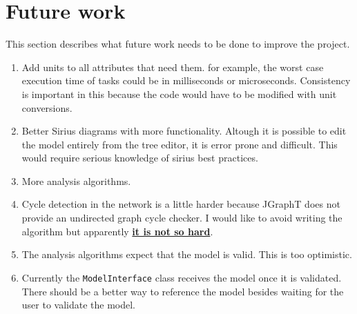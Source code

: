 \pagebreak
\section{Future work}\label{future}
This section describes what future work needs to be done to improve the project.
\begin{enumerate}
    \item Add units to all attributes that need them. for example,
    the worst case execution time of tasks could be in milliseconds
    or microseconds. Consistency is important in this because
    the code would have to be modified with unit conversions.
    \item Better Sirius diagrams with more functionality. Altough it
    is possible to edit the model entirely from the tree editor, it is
    error prone and difficult. This would require serious knowledge of
    sirius best practices.
    \item More analysis algorithms.
    \item Cycle detection in the network is a little harder because JGraphT does
    not provide an undirected graph cycle checker. I would like to avoid writing
    the algorithm but apparently 
    \href{http://stackoverflow.com/questions/526331/cycles-in-an-undirected-graph}{\textbf{it is not so hard}}. 
    \item The analysis algorithms expect that the model is valid. This is too optimistic.
    \item Currently the \texttt{ModelInterface} class receives the model once it is validated. There should be a better way to reference the model besides waiting for the user to validate the model.
\end{enumerate}
